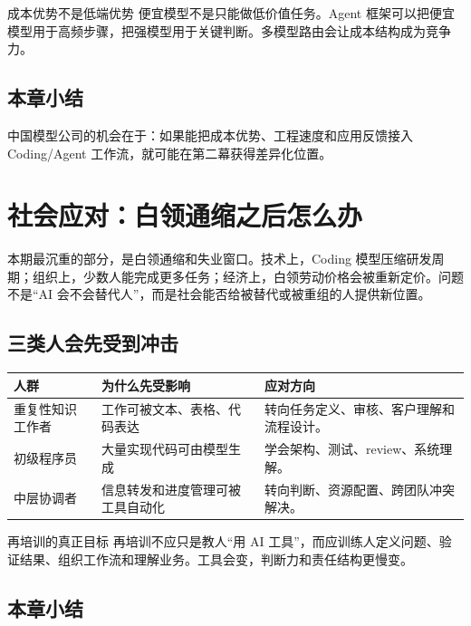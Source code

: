 \documentclass[a4paper]{article}
\begin{document}
\begin{importantbox}{成本优势不是低端优势}
便宜模型不是只能做低价值任务。Agent 框架可以把便宜模型用于高频步骤，把强模型用于关键判断。多模型路由会让成本结构成为竞争力。
\end{importantbox}

\subsection{本章小结}

中国模型公司的机会在于：如果能把成本优势、工程速度和应用反馈接入 Coding/Agent 工作流，就可能在第二幕获得差异化位置。

\section{社会应对：白领通缩之后怎么办}

本期最沉重的部分，是白领通缩和失业窗口。技术上，Coding 模型压缩研发周期；组织上，少数人能完成更多任务；经济上，白领劳动价格会被重新定价。问题不是“AI 会不会替代人”，而是社会能否给被替代或被重组的人提供新位置。

\subsection{三类人会先受到冲击}

\noindent\begin{tabularx}{\textwidth}{p{}p{}X}
\toprule
人群 & 为什么先受影响 & 应对方向 \\
\midrule
重复性知识工作者 & 工作可被文本、表格、代码表达 & 转向任务定义、审核、客户理解和流程设计。 \\
初级程序员 & 大量实现代码可由模型生成 & 学会架构、测试、review、系统理解。 \\
中层协调者 & 信息转发和进度管理可被工具自动化 & 转向判断、资源配置、跨团队冲突解决。 \\
\bottomrule
\end{tabularx}

\begin{knowledgebox}{再培训的真正目标}
再培训不应只是教人“用 AI 工具”，而应训练人定义问题、验证结果、组织工作流和理解业务。工具会变，判断力和责任结构更慢变。
\end{knowledgebox}

\subsection{本章小结}
\end{document}
